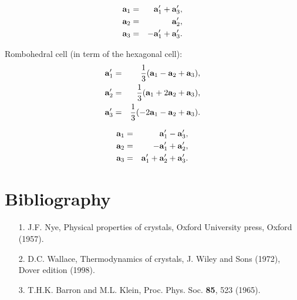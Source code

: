 \documentclass[12pt,a4paper]{article}
\begin{document}
\begin{eqnarray}
{\bf a}_1&=& {\bf a}_1' + {\bf a}_3', \\
{\bf a}_2&=& {\bf a}_2', \\
{\bf a}_3&=& -{\bf a}_1' + {\bf a}_3'.
\end{eqnarray}

Rombohedral cell (in term of the hexagonal cell):
\begin{eqnarray}
{\bf a}_1'&=&{1\over 3} ({\bf a}_1 - {\bf a}_2 + {\bf a}_3), \\
{\bf a}_2'&=&{1\over 3} ({\bf a}_1 + 2 {\bf a}_2 + {\bf a}_3), \\
{\bf a}_3'&=&{1\over 3} (-2 {\bf a}_1 - {\bf a}_2 + {\bf a}_3). 
\end{eqnarray}

\begin{eqnarray}
{\bf a}_1&=& {\bf a}_1' - {\bf a}_3', \\
{\bf a}_2&=& - {\bf a}_1' + {\bf a}_2', \\
{\bf a}_3&=& {\bf a}_1' + {\bf a}_2' + {\bf a}_3'.
\end{eqnarray}

\newpage

\section{\color{coral}Bibliography}
\begin{enumerate}


\item
[1.] J.F. Nye, Physical properties of crystals, Oxford University press, 
Oxford (1957).

\item
[2.] D.C. Wallace, Thermodynamics of crystals, J. Wiley and Sons (1972),
Dover edition (1998).

\item
[3.] T.H.K. Barron and M.L. Klein, Proc. Phys. Soc. {\bf 85}, 523 (1965).
\end{enumerate}
\end{document}
